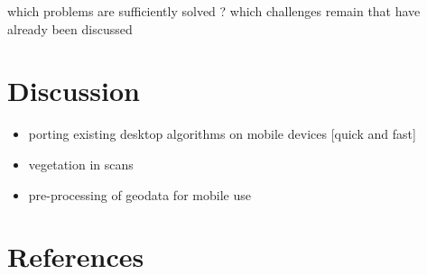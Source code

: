 \documentclass[review]{elsarticle}
\begin{document}
which problems are sufficiently solved ? 
which challenges remain that have already been discussed

\section{Discussion}
\label{sec:discussion}

\begin{itemize}
\item porting existing desktop algorithms on mobile devices [quick and fast]
\item vegetation in scans
\item pre-processing of geodata for mobile use
\end{itemize}

\section*{References}


\end{document}

